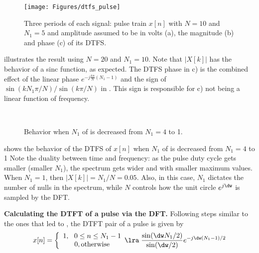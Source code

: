 \begin{figure}[!htb]
\centering
\texttt{[image: Figures/dtfs\_pulse]}
\caption{Three periods of each signal: pulse train $x[n]$ with $N=10$ and $N_1=5$ and amplitude assumed to be in volts (a), the magnitude (b) and phase (c) of its DTFS.\label{fig:dtfs_pulse}}
\end{figure}

 illustrates the result using $N=20$ and $N_1=10$. Note that $|X[k]|$ has the behavior of a sinc function, as expected. The DTFS phase in  c) is the combined effect of the linear phase $e^{-j \frac{k \pi}{N} (N_1-1)}$ and the sign of $\sin( k N_1 \pi / N)/\sin(k \pi / N)$ in . This sign is responsible for  c) not being a linear function of frequency.

\begin{figure}[!htb]
  \begin{center}
    \\
  \end{center}
  \caption{Behavior when $N_1$ of  is decreased from $N_1=4$ to 1.}
  \label{fig:dtfs_pulse_duty}
\end{figure}

 shows the behavior of the DTFS of $x[n]$ when $N_1$ of  is decreased from $N_1=4$ to 1
Note the duality between time and frequency: as the pulse duty cycle gets smaller (smaller $N_1$), the spectrum gets wider and with smaller maximum values. When $N_1=1$, then $|X[k]|=N_1/N=0.05$.
Also, in this case, $N_1$ dictates the number of nulls in the spectrum, while $N$ controls how the unit circle $e^{j \dw}$ is sampled by the DFT.
\eApplication

\bApplication \textbf{Calculating the DTFT of a pulse via the DFT.}
Following steps similar to the ones that led to , the DTFT pair of a pulse is given by
\begin{equation}
x[n] = \left\{ {\begin{array}{*{20}c} {1,~~0 \le n \le N_1 - 1} \\ {0,{\textrm{otherwise}}} \\ \end{array} \lra } \right.\frac{{\sin (\dw N_1/2)}}{{\sin (\dw /2)}}e^{ - j\dw (N_1 - 1)/2}
\label{eq:dtft_pulse}
\end{equation}


